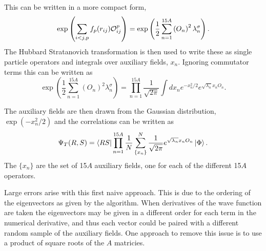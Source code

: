 This can be written in a more compact form,
\begin{equation}
    \exp\left(\sum\limits_{i<j,p}f_p(r_{ij})\mathcal{O}^p_{ij}\right) = \exp\left(\frac{1}{2}\sum\limits_{n=1}^{15A} \left(O_{n}\right)^2 \lambda_n^{\sigma}\right).
\end{equation}
The Hubbard Stratanovich transformation is then used to write these as single particle operators and integrals over auxiliary fields, $x_n$. Ignoring commutator terms this can be written as
\begin{equation}
   \exp\left(\frac{1}{2}\sum\limits_{n=1}^{15A} \left(O_{n}\right)^2 \lambda_n^{\sigma}\right) = \prod\limits_{n=1}^{15A} \frac{1}{\sqrt{2\pi}}\int dx_n e^{-x_n^2/2}e^{\sqrt{\lambda_n}x_nO_n}.
\end{equation}

The auxiliary fields are then drawn from the Gaussian distribution, $\exp\left(-x_n^2/2\right)$ and the correlations can be written as
\begin{equation}
   \Psi_T(R,S) = \left< RS \right|\prod\limits_{n=1}^{15A} \frac{1}{N} \sum\limits_{\{x_n\}}^N\frac{1}{\sqrt{2\pi}}e^{\sqrt{\lambda_n}x_nO_n}\left| \Phi \right>.
\end{equation}
The $\{x_n\}$ are the set of 15$A$ auxiliary fields, one for each of the different 15$A$ operators.

Large errors arise with this first naive approach. This is due to the ordering of the eigenvectors as given by the algorithm. When derivatives of the wave function are taken the eigenvectors may be given in a different order for each term in the numerical derivative, and thus each vector could be paired with a different random sample of the auxiliary fields. One approach to remove this issue is to use a product of square roots of the $A$ matricies.

